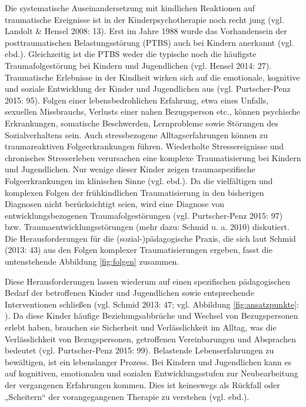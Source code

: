 Die systematische Auseinandersetzung mit kindlichen Reaktionen auf traumatische Ereignisse ist in der Kinderpsychotherapie noch recht jung (vgl. Landolt \& Hensel 2008: 13). Erst im Jahre 1988 wurde das Vorhandensein der posttraumatischen Belastungsstörung (PTBS) auch bei Kindern anerkannt (vgl. ebd.). Gleichzeitig ist die PTBS weder die typische noch die häufigste Traumafolgestörung bei Kindern und Jugendlichen (vgl. Hensel 2014: 27). Traumatische Erlebnisse in der Kindheit wirken sich auf die emotionale, kognitive und soziale Entwicklung der Kinder und Jugendlichen aus (vgl. Purtscher-Penz 2015: 95). Folgen einer lebensbedrohlichen Erfahrung, etwa eines Unfalls, sexuellen Missbrauchs, Verlusts einer nahen Bezugsperson etc., können psychische Erkrankungen, somatische Beschwerden, Lernprobleme sowie Störungen des Sozialverhaltens sein. Auch stressbezogene Alltagserfahrungen können zu traumareaktiven Folgeerkrankungen führen. Wiederholte Stressereignisse und chronisches Stresserleben verursachen eine komplexe Traumatisierung bei Kindern und Jugendlichen. Nur wenige dieser Kinder zeigen traumaspezifische Folgeerkrankungen im klinischen Sinne (vgl. ebd.). Da die vielfältigen und komplexen Folgen der frühkindlichen Traumatisierung in den bisherigen Diagnosen nicht berücksichtigt seien, wird eine Diagnose von entwicklungsbezogenen Traumafolgestörungen (vgl. Purtscher-Penz 2015: 97) bzw. Traumaentwicklungsstörungen (mehr dazu: Schmid u. a. 2010) diskutiert. Die Herausforderungen für die (sozial-)pädagogische Praxis, die sich laut Schmid (2013: 43) aus den Folgen komplexer Traumatisierungen ergeben, fasst die untenstehende Abbildung \ref{fig:folgen} zusammen.

Diese Herausforderungen lassen wiederum auf einen spezifischen pädagogischen Bedarf der betroffenen Kinder und Jugendlichen sowie entsprechende Interventionen schließen (vgl. Schmid 2013: 47; vgl. Abbildung \ref{fig:ansatzpunkte}: \pageref{fig:ansatzpunkte}). Da diese Kinder häufige Beziehungsabbrüche und Wechsel von Bezugspersonen erlebt haben, brauchen sie Sicherheit und Verlässlichkeit im Alltag, was die Verlässlichkeit von Bezugspersonen, getroffenen Vereinbarungen und Absprachen bedeutet (vgl. Purtscher-Penz 2015: 99). Belastende Lebenserfahrungen zu bewältigen, ist ein lebenslanger Prozess. Bei Kindern und Jugendlichen kann es auf kognitiven, emotionalen und sozialen Entwicklungsstufen zur Neubearbeitung der vergangenen Erfahrungen kommen. Dies ist keineswegs als Rückfall oder „Scheitern“ der vorangegangenen Therapie zu verstehen (vgl. ebd.).

